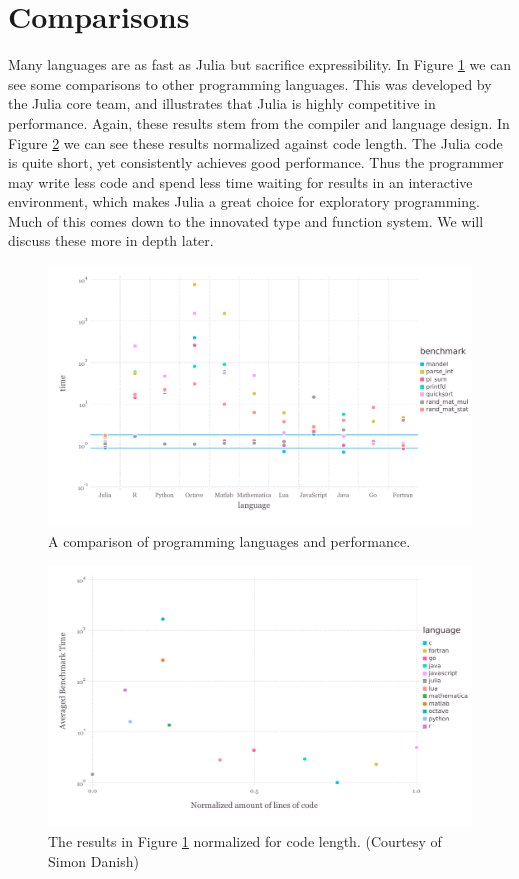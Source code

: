 \section{Comparisons}

Many languages are as fast as Julia but sacrifice expressibility.
In Figure \ref{fig:juliabench} we can see some comparisons to other programming
languages. This was developed by the Julia core team, and illustrates that
Julia is highly competitive in performance. Again, these results stem from
the compiler and language design. In Figure \ref{fig:juliaexpr} we can see
these results normalized against code length. The Julia code is quite short,
yet consistently achieves good performance.
Thus the programmer may write less code and spend less time waiting
for results in an interactive environment, which makes Julia a great choice
for exploratory programming.
Much of this comes down to the innovated type and function system.\cite{Chen2014} We will
discuss these more in depth later.

\begin{figure}[h!]
  \centering
    \includegraphics[width=1.0\textwidth]{img/juliabench.pdf}
  \caption{A comparison of programming languages and performance.}
  \label{fig:juliabench}
\end{figure}

\begin{figure}[h!]
  \centering
    \includegraphics[width=1.0\textwidth]{img/expressability.pdf}
  \caption{The results in Figure \ref{fig:juliabench} normalized for code length. (Courtesy of Simon Danish)}
  \label{fig:juliaexpr}
\end{figure}


